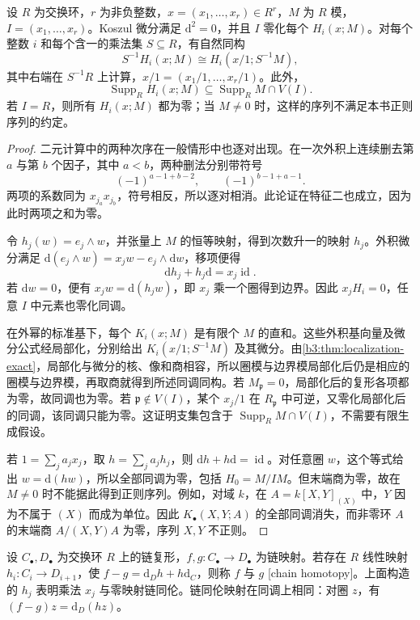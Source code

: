 \begin{proposition}\label{b3:prop:koszul-signs-homotopy}
	设 \(R\) 为交换环，\(r\) 为非负整数，\(x=(x_1,\ldots,x_r)\in R^r\)，\(M\) 为 \(R\) 模，\(I=(x_1,\ldots,x_r)\)。Koszul 微分满足 \(\mathrm{d}^2=0\)，并且 \(I\) 零化每个 \(H_i(x;M)\)。对每个整数 \(i\) 和每个含一的乘法集 \(S\subseteq R\)，有自然同构
	\[
		S^{-1}H_i(x;M)\cong H_i(x/1;S^{-1}M),
	\]
	其中右端在 \(S^{-1}R\) 上计算，\(x/1=(x_1/1,\ldots,x_r/1)\)。此外，
	\[
		\operatorname{Supp}_R H_i(x;M) \subseteq\operatorname{Supp}_R M\cap V(I).
	\]
	若 \(I=R\)，则所有 \(H_i(x;M)\) 都为零；当 \(M\ne0\) 时，这样的序列不满足本书正则序列的约定。
\end{proposition}
\begin{proof}
	二元计算中的两种次序在一般情形中也逐对出现。在一次外积上连续删去第 \(a\) 与第 \(b\) 个因子，其中 \(a<b\)，两种删法分别带符号
	\[
		(-1)^{a-1+b-2},\qquad (-1)^{b-1+a-1}.
	\]
	两项的系数同为 \(x_{j_a}x_{j_b}\)，符号相反，所以逐对相消。此论证在特征二也成立，因为此时两项之和为零。

	令 \(h_j(w)=e_j\wedge w\)，并张量上 \(M\) 的恒等映射，得到次数升一的映射 \(h_j\)。外积微分满足 \(\mathrm{d}(e_j\wedge w)=x_jw-e_j\wedge\mathrm{d}w\)，移项便得
	\[
		\mathrm{d} h_j+h_j\mathrm{d}=x_j\operatorname{id}.
	\]
	若 \(\mathrm{d}w=0\)，便有 \(x_jw=\mathrm{d}(h_jw)\)，即 \(x_j\) 乘一个圈得到边界。因此 \(x_jH_i=0\)，任意 \(I\) 中元素也零化同调。

	在外幂的标准基下，每个 \(K_i(x;M)\) 是有限个 \(M\) 的直和。这些外积基向量及微分公式经局部化，分别给出 \(K_i(x/1;S^{-1}M)\) 及其微分。由\cref{b3:thm:localization-exact}，局部化与微分的核、像和商相容，所以圈模与边界模局部化后仍是相应的圈模与边界模，再取商就得到所述同调同构。若 \(M_{\mathfrak p}=0\)，局部化后的复形各项都为零，故同调也为零。若 \(\mathfrak p\notin V(I)\)，某个 \(x_j/1\) 在 \(R_{\mathfrak p}\) 中可逆，又零化局部化后的同调，该同调只能为零。这证明支集包含于 \(\operatorname{Supp}_R M\cap V(I)\)，不需要有限生成假设。

	若 \(1=\sum_j a_jx_j\)，取 \(h=\sum_j a_jh_j\)，则 \(\mathrm{d}h+h\mathrm{d}=\operatorname{id}\)。对任意圈 \(w\)，这个等式给出 \(w=\mathrm{d}(hw)\)，所以全部同调为零，包括 \(H_0=M/IM\)。但末端商为零，故在 \(M\ne0\) 时不能据此得到正则序列。例如，对域 \(k\)，在 \(A=k[X,Y]_{(X)}\) 中，\(Y\) 因为不属于 \((X)\) 而成为单位。因此 \(K_\bullet(X,Y;A)\) 的全部同调消失，而非零环 \(A\) 的末端商 \(A/(X,Y)A\) 为零，序列 \(X,Y\) 不正则。
\end{proof}

设 \(C_\bullet,D_\bullet\) 为交换环 \(R\) 上的链复形，\(f,g:C_\bullet\rightarrow D_\bullet\) 为链映射。若存在 \(R\) 线性映射 \(h_i:C_i\rightarrow D_{i+1}\)，使 \(f-g=\mathrm{d}_Dh+h\mathrm{d}_C\)，则称 \(f\) 与 \(g\) [chain homotopy]。上面构造的 \(h_j\) 表明乘法 \(x_j\) 与零映射链同伦。链同伦映射在同调上相同：对圈 \(z\)，有 \((f-g)z=\mathrm{d}_D(hz)\)。

